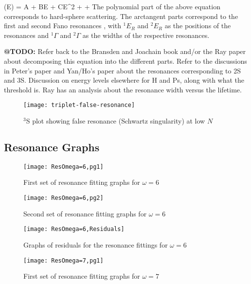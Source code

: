 \documentclass[Dissertation.tex]{subfiles}
\begin{document}
\beq
\label{eq:ResonanceCurve}
\delta(E) = A + BE + CE^2 + \arctan{} + \arctan{}
\eeq
The polynomial part of the above equation corresponds to hard-sphere scattering. The arctangent parts correspond to the first and second Fano resonances \cite{Fano1961,Macek1970,Hazi1979}, with $^1E_R$ and $^2E_R$ as the positions of the resonances and $^1\Gamma$ and $^2\Gamma$ as the widths of the respective resonances.

\textbf{@TODO:} Refer back to the Bransden and Joachain book and/or the Ray paper about decomposing this equation into the different parts. Refer to the discussions in Peter's paper and Yan/Ho's paper about the resonances corresponding to 2S and 3S.  Discussion on energy levels elsewhere for H and Ps, along with what the threshold is. Ray has an analysis about the resonance width versus the lifetime.

\begin{figure}[H]
	\centering
	\texttt{[image: triplet-false-resonance]}
	\caption{$^3$S plot showing false resonance (Schwartz singularity) at low $N$}
	\label{fig:triplet-false-resonance}
\end{figure}

\subsection{Resonance Graphs}
\label{sec:ResonanceGraphs}

\begin{figure}[H]
	\centering
	\texttt{[image: ResOmega=6,pg1]}
	\caption{First set of resonance fitting graphs for $\omega = 6$}
	\label{fig:ResOmega=6,pg1}
\end{figure}

\begin{figure}[H]
	\centering
	\texttt{[image: ResOmega=6,pg2]}
	\caption{Second set of resonance fitting graphs for $\omega = 6$}
	\label{fig:ResOmega=6,pg2}
\end{figure}

\begin{figure}[H]
	\centering
	\texttt{[image: ResOmega=6,Residuals]}
	\caption{Graphs of residuals for the resonance fittings for $\omega = 6$}
	\label{fig:ResOmega=6,Residuals}
\end{figure}

\begin{figure}[H]
	\centering
	\texttt{[image: ResOmega=7,pg1]}
	\caption{First set of resonance fitting graphs for $\omega = 7$}
	\label{fig:ResOmega=7,pg1}
\end{figure}
\end{document}
